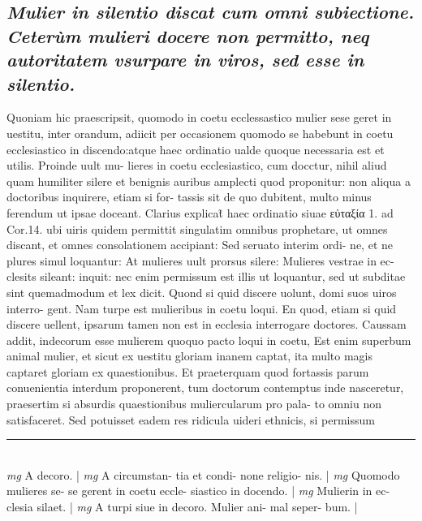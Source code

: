 \documentclass{article}
\begin{document}
\begin{pages}
\subsection*{\textit{Mulier in silentio discat cum omni subiectione. Ceterùm mulieri docere non permitto, neq autoritatem vsurpare in viros, sed esse in silentio. }}\pstart Quoniam hic praescripsit, quomodo in coetu ecclessastico mulier sese geret in uestitu, inter orandum, adiicit per occasionem quomodo se habebunt in coetu ecclesiastico in discendo:atque haec ordinatio ualde quoque necessaria est et utilis. Proinde uult mu- lieres in coetu ecclesiastico, cum docctur, nihil aliud quam humiliter silere et benignis auribus amplecti quod proponitur: non aliqua a doctoribus inquirere, etiam si for- tassis sit de quo dubitent, multo minus ferendum ut ipsae doceant. Clarius explicat̃ haec ordinatio siuae εὐταξία 1. ad Cor.14. ubi uiris quidem permittit singulatim omnibus prophetare, ut omnes discant, et omnes consolationem accipiant: Sed seruato interim ordi- ne, et ne plures simul loquantur: At mulieres uult prorsus silere: Mulieres vestrae in ec- clesits sileant: inquit: nec enim permissum est illis ut loquantur, sed ut subditae sint quemadmodum et lex dicit. Quond si quid discere uolunt, domi suos uiros interro- gent. Nam turpe est mulieribus in coetu loqui. En quod, etiam si quid discere uellent, ipsarum tamen non est in ecclesia interrogare doctores. Caussam addit, indecorum esse mulierem quoquo pacto loqui in coetu, Est enim superbum animal mulier, et sicut ex uestitu gloriam inanem captat, ita multo magis captaret gloriam ex quaestionibus. Et praeterquam quod fortassis parum conuenientia interdum proponerent, tum doctorum contemptus inde nasceretur, praesertim si absurdis quaestionibus muliercularum pro pala- to omniu non satisfaceret. Sed potuisset eadem res ridicula uideri ethnicis, si permissum  \pend
\vspace{0.5cm}\noindent
\vspace{0.2cm}\rule{1cm}{0.2pt}\\ 
\hspace{0.2cm}\textit{mg}
\footnotesize A decoro. 
\normalsize| 
\hspace{0.2cm}\textit{mg}
\footnotesize A circumstan- tia et condi- none religio- nis. 
\normalsize| 
\hspace{0.2cm}\textit{mg}
\footnotesize Quomodo mulieres se- se gerent in coetu eccle- siastico in docendo. 
\normalsize| 
\hspace{0.2cm}\textit{mg}
\footnotesize Mulierin in ec- clesia silaet. 
\normalsize| 
\hspace{0.2cm}\textit{mg}
\footnotesize A turpi siue in decoro. Mulier ani- mal seper- bum. 
\normalsize| 

\end{pages}
\end{document}
